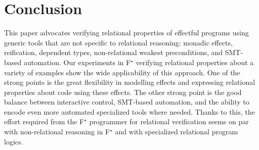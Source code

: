 \documentclass[sigplan,screen]{acmart}\settopmatter{}
\newcommand\fstar{F$^\star$\xspace}
\newcommand{\comm}[3]{\ifcheckpagebudget\else\ifdraft{\maybecolor{#1}[#2: #3]}\fi\fi}
\newcommand{\ch}[1]{\comm{teal}{CH}{#1}}
\newcommand*{\EG}{e.g.,\xspace}
\begin{document}
%
\fi

\section{Conclusion}

This paper advocates verifying relational properties of effectful
programs using generic tools that are not specific to relational
reasoning: monadic effects, reification, dependent types,
non-relational weakest preconditions, and SMT-based automation.
%
Our experiments in \fstar{} verifying relational properties about a
variety of examples show the wide applicability of this approach.
%
One of the strong points is the great flexibility in modelling effects
and expressing relational properties about code using these effects.
%
The other strong point is the good balance between interactive control,
SMT-based automation, and the ability to encode even more automated
specialized tools where needed.
%
Thanks to this, the effort required from the \fstar{} programmer for
relational verification seems
on par with non-relational reasoning in \fstar{} and with specialized
relational program logics.

\end{document}
